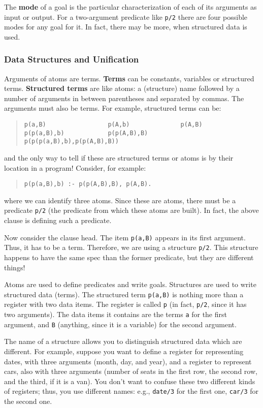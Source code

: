 The {\bf mode} of a goal is the particular characterization of each of
its arguments as input or output. For a two-argument predicate like
\verb+p/2+ there are four possible modes for any goal for it. In fact,
there may be more, when structured data is used.

\subsubsection{Data Structures and Unification}

Arguments of atoms are terms. {\bf Terms} can be constants, variables
or structured terms. {\bf Structured terms} are like atoms: a
(structure) name followed by a number of arguments in between
parentheses and separated by commas. The arguments must also be
terms. For example, structured terms can be:
\begin{quote}
\begin{verbatim}
p(a,B)                 p(A,b)              p(A,B)
p(p(a,B),b)            p(p(A,B),B)         p(p(p(a,B),b),p(p(A,B),B))
\end{verbatim}
\end{quote}
%
and the only way to tell if these are structured terms or atoms is by
their location in a program! Consider, for example:
\begin{quote}
\begin{verbatim}
p(p(a,B),b) :- p(p(A,B),B), p(A,B).
\end{verbatim}
\end{quote}
%
where we can identify three atoms. Since these are atoms, there must
be a predicate \verb+p/2+ (the predicate from which these atoms are
built). In fact, the above clause is defining such a predicate.

Now consider the clause head. The item \verb+p(a,B)+ appears in its
first argument. Thus, it has to be a term. Therefore, we are using a
structure \verb+p/2+. This structure happens to have the same spec
than the former predicate, but they are different things!

Atoms are used to define predicates and write goals. Structures are
used to write structured data (terms). The structured term
\verb+p(a,B)+ is nothing more than a register with two data items. The
register is called \verb+p+ (in fact, \verb+p/2+, since it has two
arguments). The data items it contains are the terms \verb+a+ for the
first argument, and \verb+B+ (anything, since it is a variable) for
the second argument.

The name of a structure allows you to distinguish structured data
which are different. For example, suppose you want to define a
register for representing dates, with three arguments (month, day, and
year), and a register to represent cars, also with three arguments
(number of seats in the first row, the second row, and the third, if
it is a van). You don't want to confuse these two different kinds of
registers; thus, you use different names: e.g., \verb+date/3+ for the
first one, \verb+car/3+ for the second one.

